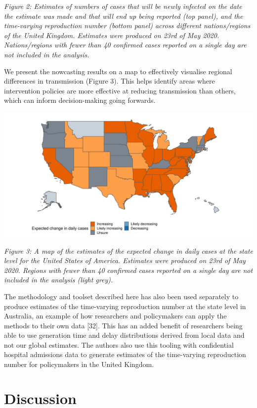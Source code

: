 \documentclass[
]{article}
\begin{document}
\emph{Figure 2: Estimates of numbers of cases that will be newly
infected on the date the estimate was made and that will end up being
reported (top panel), and the time-varying reproduction number (bottom
panel) across different nations/regions of the United Kingdom. Estimates
were produced on 23rd of May 2020. Nations/regions with fewer than 40
confirmed cases reported on a single day are not included in the
analysis.}

We present the nowcasting results on a map to effectively visualise
regional differences in transmission (Figure 3). This helps identify
areas where intervention policies are more effective at reducing
transmission than others, which can inform decision-making going
forwards.

\includegraphics[width=0.9\linewidth]{figures/figure_3}

\emph{Figure 3: A map of the estimates of the expected change in daily
cases at the state level for the United States of America. Estimates
were produced on 23rd of May 2020. Regions with fewer than 40 confirmed
cases reported on a single day are not included in the analysis (light
grey).}

The methodology and toolset described here has also been used separately
to produce estimates of the time-varying reproduction number at the
state level in Australia, an example of how researchers and policymakers
can apply the methods to their own data {[}32{]}. This has an added
benefit of researchers being able to use generation time and delay
distributions derived from local data and not our global estimates. The
authors also use this tooling with confidential hospital admissions data
to generate estimates of the time-varying reproduction number for
policymakers in the United Kingdom.

\hypertarget{discussion}{%
\section{Discussion}\label{discussion}}
\end{document}
